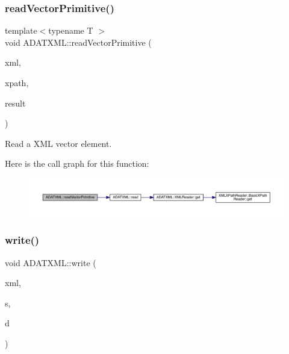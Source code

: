 \subsubsection{\texorpdfstring{readVectorPrimitive()}{readVectorPrimitive()}}
{\footnotesize\ttfamily template$<$typename T $>$ \\
void A\+D\+A\+T\+X\+M\+L\+::read\+Vector\+Primitive (\begin{DoxyParamCaption}\item[{\mbox{\hyperlink{classADATXML_1_1XMLReader}{X\+M\+L\+Reader}} \&}]{xml,  }\item[{const std\+::string \&}]{xpath,  }\item[{std\+::vector$<$ T $>$ \&}]{result }\end{DoxyParamCaption})}



Read a X\+ML vector element. 

Here is the call graph for this function\+:\nopagebreak
\begin{figure}[H]
\begin{center}
\leavevmode
\includegraphics[width=350pt]{d7/da0/namespaceADATXML_a485bbc9069166009de61296df9dfe74b_cgraph}
\end{center}
\end{figure}
\mbox{\label{namespaceADATXML_ad05599b1c54c5e920891cbcce093a4bc}} 
\subsubsection{\texorpdfstring{write()}{write()}\hspace{0.1cm}{\footnotesize\ttfamily [1/12]}}
{\footnotesize\ttfamily void A\+D\+A\+T\+X\+M\+L\+::write (\begin{DoxyParamCaption}\item[{\mbox{\hyperlink{classADATXML_1_1XMLWriter}{X\+M\+L\+Writer}} \&}]{xml,  }\item[{const string \&}]{s,  }\item[{const string \&}]{d }\end{DoxyParamCaption})}

\mbox{\label{namespaceADATXML_ad11e81d6d4aa85c354971b245aee9581}} 
